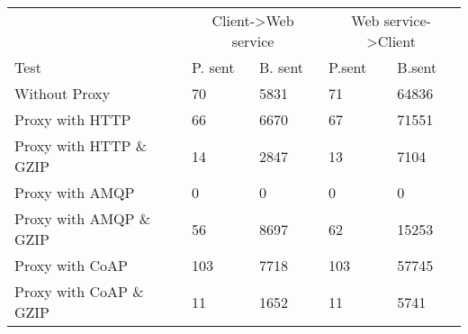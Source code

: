 \begin{tabularx}{\textwidth}{lXXXX}
\hline
\multicolumn{1}{l}{}                  & \multicolumn{2}{c}{Client->Web service}                           & \multicolumn{2}{c}{Web service->Client}                           \\
\multicolumn{1}{l}{Test} & \multicolumn{1}{l}{P. sent} & \multicolumn{1}{l}{B. sent} & \multicolumn{1}{l}{P.sent} & \multicolumn{1}{l}{B.sent} \\ \hline
Without Proxy                   & 70             & 5831           & 71             & 64836          \\
Proxy with HTTP                 & 66             & 6670           & 67             & 71551          \\
Proxy with HTTP \& GZIP         & 14             & 2847           & 13             & 7104           \\
Proxy with AMQP                 & 0              & 0              & 0              & 0              \\
Proxy with AMQP \& GZIP         & 56             & 8697           & 62             & 15253          \\
Proxy with CoAP                 & 103            & 7718           & 103            & 57745          \\
Proxy with CoAP \& GZIP         & 11             & 1652           & 11             & 5741           \\
\end{tabularx}
